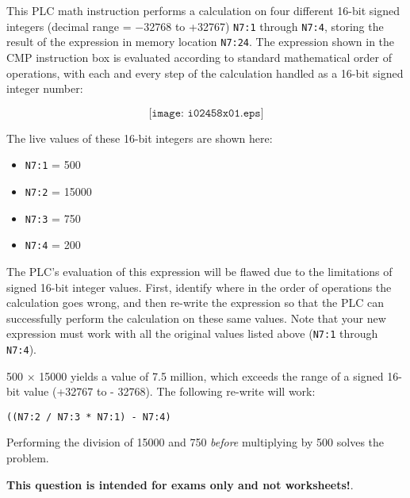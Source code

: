 

This PLC math instruction performs a calculation on four different 16-bit signed integers (decimal range = $-32768$ to +32767) {\tt N7:1} through {\tt N7:4}, storing the result of the expression in memory location {\tt N7:24}.  The expression shown in the CMP instruction box is evaluated according to standard mathematical order of operations, with each and every step of the calculation handled as a 16-bit signed integer number:

$$\texttt{[image: i02458x01.eps]}$$

The live values of these 16-bit integers are shown here:

\begin{itemize}
\item{} {\tt N7:1} = 500
\item{} {\tt N7:2} = 15000
\item{} {\tt N7:3} = 750
\item{} {\tt N7:4} = 200
\end{itemize}

The PLC's evaluation of this expression will be flawed due to the limitations of signed 16-bit integer values.  First, identify where in the order of operations the calculation goes wrong, and then re-write the expression so that the PLC can successfully perform the calculation on these same values.  Note that your new expression must work with all the original values listed above ({\tt N7:1} through {\tt N7:4}).

\vskip 100pt







500 $\times$ 15000 yields a value of 7.5 million, which exceeds the range of a signed 16-bit value (+32767 to - 32768).  The following re-write will work:

\vskip 10pt

{\tt ((N7:2 / N7:3 * N7:1) - N7:4)} 

\vskip 10pt

Performing the division of 15000 and 750 {\it before} multiplying by 500 solves the problem.







{\bf This question is intended for exams only and not worksheets!}.


